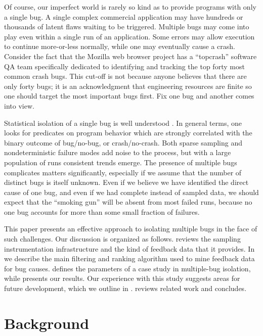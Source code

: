\documentclass{sig-alternate}
\begin{document}
Of course, our imperfect world is rarely so kind as to provide
programs with only a single bug.  A single complex commercial
application may have hundreds or thousands of latent flaws waiting to
be triggered.  Multiple bugs may come into play even within a single
run of an application.  Some errors may allow execution to continue
more-or-less normally, while one may eventually cause a crash.
Consider the fact that the Mozilla web browser project has a
``topcrash'' software QA team specifically dedicated to identifying
and tracking the top forty most common crash bugs.  This cut-off is
not because anyone believes that there are only forty bugs; it is an
acknowledgment that engineering resources are finite so one should
target the most important bugs first.  Fix one bug and another comes
into view.

Statistical isolation of a single bug is well understood
\cite{Zheng:2003:SDSP}.  In general terms, one looks for predicates on
program behavior which are strongly correlated with the binary outcome
of bug/no-bug, or crash/no-crash.  Both sparse sampling and
nondeterministic failure modes add noise to the process, but with a
large population of runs consistent trends emerge.  The presence of
multiple bugs complicates matters significantly, especially if we
assume that the number of distinct bugs is itself unknown.  Even if we
believe we have identified the direct cause of one bug, and even if we
had complete instead of sampled data, we should expect that the
``smoking gun'' will be absent from most failed runs, because no one
bug accounts for more than some small fraction of failures.

This paper presents an effective approach to isolating multiple bugs
in the face of such challenges.  Our discussion is organized as
follows.   reviews the sampling
instrumentation infrastructure and the kind of feedback data that it
provides.  In  we describe the main filtering
and ranking algorithm used to mine feedback data for bug causes.
 defines the parameters of a case study
in multiple-bug isolation, while 
presents our results.  Our experience with this study suggests areas
for future development, which we outline in .
 reviews related work and
 concludes.

\section{Background}
\label{sec:background}
\end{document}
